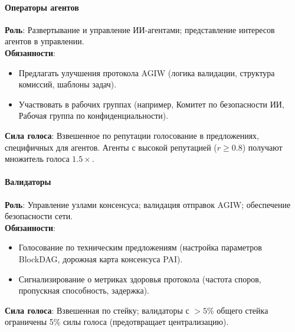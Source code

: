 \documentclass[11pt]{article}
\begin{document}
\paragraph{Операторы агентов}
\textbf{Роль}: Развертывание и управление ИИ-агентами; представление интересов агентов в управлении.\\
\textbf{Обязанности}:
\begin{itemize}[noitemsep]
  \item Предлагать улучшения протокола AGIW (логика валидации, структура комиссий, шаблоны задач).
  \item Участвовать в рабочих группах (например, Комитет по безопасности ИИ, Рабочая группа по конфиденциальности).
\end{itemize}
\textbf{Сила голоса}: Взвешенное по репутации голосование в предложениях, специфичных для агентов. Агенты с высокой репутацией ($r \geq 0.8$) получают множитель голоса $1.5\times$.

\paragraph{Валидаторы}
\textbf{Роль}: Управление узлами консенсуса; валидация отправок AGIW; обеспечение безопасности сети.\\
\textbf{Обязанности}:
\begin{itemize}[noitemsep]
  \item Голосование по техническим предложениям (настройка параметров BlockDAG, дорожная карта консенсуса PAI).
  \item Сигнализирование о метриках здоровья протокола (частота споров, пропускная способность, задержка).
\end{itemize}
\textbf{Сила голоса}: Взвешенная по стейку; валидаторы с $>5\%$ общего стейка ограничены 5\% силы голоса (предотвращает централизацию).
\end{document}
